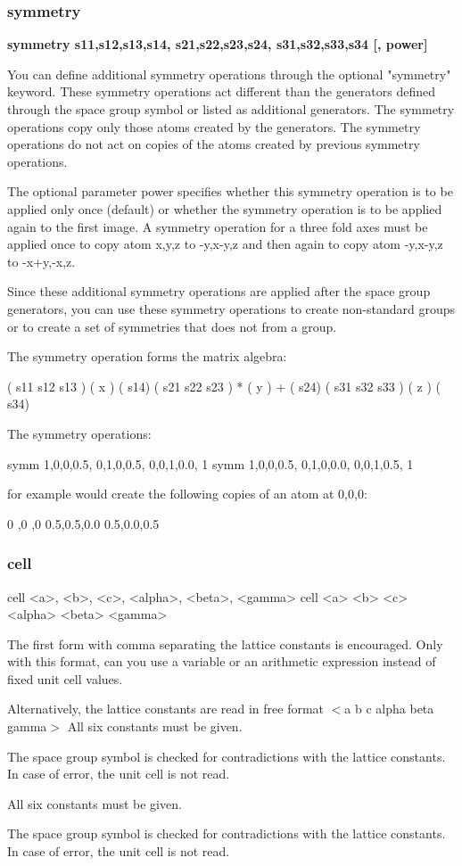 \subsubsection{symmetry}
{\bf symmetry s11,s12,s13,s14, s21,s22,s23,s24, s31,s32,s33,s34 [, power] \par }
\par
\vspace{3pt}
You can define additional symmetry operations through the optional 
"symmetry" keyword. These symmetry operations act different than the 
generators defined through the space group symbol or listed as additional 
generators. The symmetry operations copy only those atoms created by the 
generators. The symmetry operations do not act on copies of the atoms 
created by previous symmetry operations. 
\par
The optional parameter power specifies whether this symmetry operation 
is to be applied only once (default) or whether the symmetry operation 
is to be applied again to the first image. A symmetry operation for a 
three fold axes must be applied once to copy atom x,y,z to -y,x-y,z and 
then again to copy atom -y,x-y,z to -x+y,-x,z. 
\par
Since these additional symmetry operations are applied after the space group 
generators, you can use these symmetry operations to create non-standard 
groups or to create a set of symmetries that does not from a group. 
\par
The symmetry operation forms the matrix algebra: 
\par
( s11  s12  s13 )   ( x )   ( s14) 
( s21  s22  s23 ) * ( y ) + ( s24) 
( s31  s32  s33 )   ( z )   ( s34) 
\par
The symmetry operations: 
\begin{MacVerbatim}
   symm 1,0,0,0.5, 0,1,0,0.5, 0,0,1,0.0, 1
   symm 1,0,0,0.5, 0,1,0,0.0, 0,0,1,0.5, 1
\end{MacVerbatim}
for example would create the following copies of an atom at 0,0,0: 
\begin{MacVerbatim}
    0  ,0  ,0
    0.5,0.5,0.0
    0.5,0.0,0.5
\end{MacVerbatim}
\subsubsection{cell}
\begin{MacVerbatim}
cell  <a>,  <b>,  <c>, <alpha>,  <beta>,  <gamma>
cell  <a>   <b>   <c>  <alpha>   <beta>   <gamma>
\end{MacVerbatim}
The first form with comma separating the lattice constants is 
encouraged. Only with this format, can you use a variable or 
an arithmetic expression instead of fixed unit cell values. 
\par
Alternatively, the lattice constants are read in free format 
$ <$a b c alpha beta gamma$> $ 
All six constants must be given. 
\par
The space group symbol is checked for contradictions with the lattice 
constants. In case of error, the unit cell is not read. 
\par
All six constants must be given. 
\par
The space group symbol is checked for contradictions with the lattice 
constants. In case of error, the unit cell is not read. 
